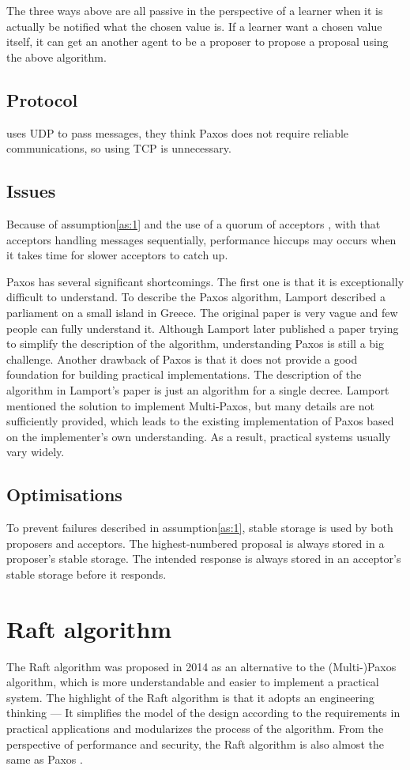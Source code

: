 \documentclass[12pt, a4paper]{article}
\begin{document}
The three ways above are all passive in the perspective of a learner when
it is actually be notified what the chosen value is.
If a learner want a chosen value itself, 
it can get an another agent to be  a proposer 
to propose a proposal using the above algorithm. 
\subsection{Protocol}
\cite{PaxosMadeSwitch-y} uses UDP to pass messages, 
they think Paxos does not require reliable communications, 
so using TCP is unnecessary.
\subsection{Issues}
Because of assumption\ref{as:1} and 
the use of a quorum of acceptors \cite{jalili2014practical}, 
with that acceptors handling messages sequentially,
performance hiccups may occurs when it takes time for slower acceptors 
to catch up.


Paxos has several significant shortcomings. The first one is that it 
is exceptionally difficult to understand\cite{conf/usenix/OngaroO14}. 
To describe the Paxos algorithm, Lamport described a parliament on a 
small island in Greece\cite{lamport1998part}. The original paper is 
very vague and few people can fully understand it. Although Lamport 
later published a paper trying to simplify the description of the 
algorithm\cite{lamport2001paxos}, understanding Paxos is still a big 
challenge. Another drawback of Paxos is that it does not provide a 
good foundation for building practical implementations\cite{conf/usenix/OngaroO14}.
The description of the algorithm in Lamport's paper is just an 
algorithm for a single decree. Lamport mentioned the solution to 
implement Multi-Paxos, but many details are not sufficiently provided, 
which leads to the existing implementation of Paxos based on the 
implementer's own understanding. As a result, practical systems usually
vary widely.

\subsection{Optimisations}
To prevent failures described in assumption\ref{as:1}, 
stable storage is used by both proposers and acceptors.
The highest-numbered proposal is always stored in a proposer's stable storage.
The intended response is always stored in an acceptor's stable storage
before it responds.

\section{Raft algorithm} \label{sec:raft}
The Raft algorithm was proposed in 2014\cite{conf/usenix/OngaroO14} as an alternative to the (Multi-)Paxos algorithm, which is more
understandable and easier to implement a practical system. The highlight of the Raft algorithm is that it adopts an
engineering thinking --- It simplifies the model of the design according to the requirements in practical applications and
modularizes the process of the algorithm. From the perspective of performance and security, the Raft algorithm is also almost
the same as Paxos \cite{conf/usenix/OngaroO14}.
\end{document}
